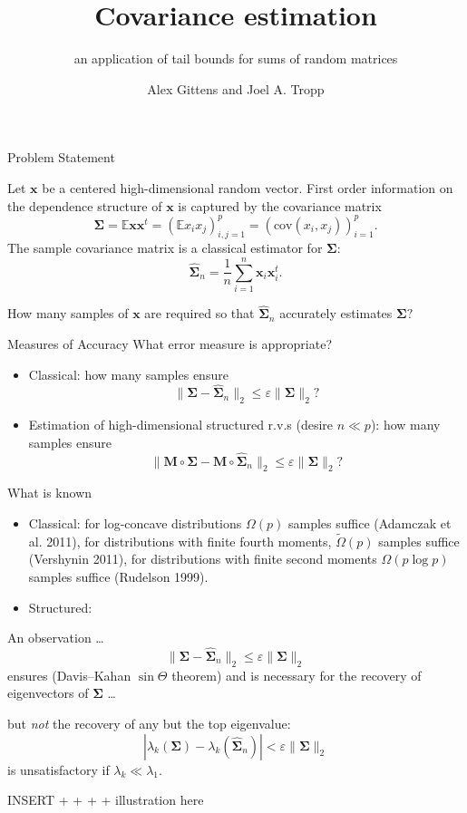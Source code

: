 \documentclass[pdf,mpa]{prosper}
\title{Covariance estimation}
\subtitle{an application of tail bounds for sums of random matrices}
\author{Alex Gittens and Joel A. Tropp}
\newcommand{\mat}[1]{\ensuremath{\mathbf{#1}}}
\newcommand{\E}{\ensuremath{\mathbb{E}}}
\begin{document}
\maketitle

\begin{slide}{Problem Statement}

Let $\mat{x}$ be a centered high-dimensional random vector. First order information on the dependence structure of $\mat{x}$ is captured by the covariance matrix
\[
\mat{\Sigma} = \E \mat{x} \mat{x}^t = (\E x_i x_j)_{i,j=1}^p = (\text{cov}(x_i, x_j))_{i=1}^p.
\]
The sample covariance matrix is a classical estimator for $\mat{\Sigma}:$
\[
\widehat{\mat{\Sigma}}_n = \frac{1}{n} \sum_{i=1}^n \mat{x}_i\mat{x}_i^t.
\]

How many samples of $\mat{x}$ are required so that $\widehat{\mat{\Sigma}}_n$ accurately estimates $\mat{\Sigma}?$

\end{slide}

\begin{slide}{Measures of Accuracy}
What error measure is appropriate?

\begin{itemize}
\item Classical: how many samples ensure \[ \|\mat{\Sigma} - \widehat{\mat{\Sigma}}_n\|_2 \leq \varepsilon \|\mat{\Sigma}\|_2? \]
\item Estimation of high-dimensional structured r.v.s (desire $n \ll p$): how many samples ensure \[ \|\mat{M}\circ \mat{\Sigma} - \mat{M} \circ \widehat{\mat{\Sigma}}_n\|_2 \leq \varepsilon \|\mat{\Sigma}\|_2? \]
\end{itemize}

\end{slide}

\begin{slide}{What is known}
\begin{itemize}
	\item Classical: for log-concave distributions $\Omega(p)$ samples suffice (Adamczak et al. 2011), for distributions with finite fourth moments, $\tilde{\Omega}(p)$ samples suffice (Vershynin 2011), for distributions with finite second moments $\Omega(p\log p)$ samples suffice (Rudelson 1999). 
	\item Structured:
\end{itemize}
\end{slide}

\begin{slide}{An observation \dots}
\[
\|\mat{\Sigma} - \widehat{\mat{\Sigma}}_n\|_2 \leq \varepsilon \|\mat{\Sigma}\|_2
\]
ensures (Davis--Kahan $\sin \Theta$ theorem) and is necessary for the recovery of eigenvectors of $\mat{\Sigma}$ \dots

but \emph{not} the recovery of any but the top eigenvalue:
\[
|\lambda_k(\mat{\Sigma}) - \lambda_k(\widehat{\mat{\Sigma}}_n)| < \varepsilon \|\mat{\Sigma}\|_2 
\]
is unsatisfactory if $\lambda_k \ll \lambda_1.$

INSERT + + +             + illustration here

\end{slide}
\end{document}
